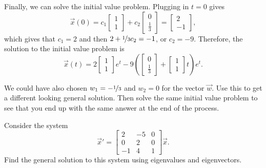 \documentclass{ximera}
\begin{document}
\begin{exampleSol}
    Finally, we can solve the initial value problem. Plugging in $t=0$ gives
    \begin{equation*}
        \vec{x}(0) = c_1 
        \begin{bmatrix} 
            1 \\ 
            1 
        \end{bmatrix} + c_2 
        \begin{bmatrix} 
            0 \\ 
            \frac{1}{3} 
        \end{bmatrix} = 
        \begin{bmatrix} 
            2 \\ 
            -1 
        \end{bmatrix},
    \end{equation*}
    which gives that $c_1 = 2$ and then $2 + \nicefrac{1}{3}c_2 = -1$, or $c_2 = -9$. Therefore, the solution to the initial value problem is
    \begin{equation*}
        \vec{x}(t) = 2 
        \begin{bmatrix} 
            1 \\ 
            1 
        \end{bmatrix} 
        e^t - 9 \left(
        \begin{bmatrix} 
            0 \\ 
            \frac{1}{3}
        \end{bmatrix} + 
        \begin{bmatrix} 
            1 \\ 
            1 
        \end{bmatrix} 
        t \right) e^{t}.
    \end{equation*}
\end{exampleSol}

\begin{exercise}
    We could have also chosen $w_1 = -\nicefrac{1}{3}$ and $w_2 = 0$ for the vector $\vec{w}$. Use this to get a different looking general solution. Then solve the same initial value problem to see that you end up with the same answer at the end of the process. 
\end{exercise}

\begin{example}
    Consider the system
    \begin{equation*}
        \vec{x}' =
        \begin{bmatrix}
            2 & -5 & 0 \\
            0 & 2 & 0 \\
            -1 & 4 & 1
        \end{bmatrix}
        \vec{x} .
    \end{equation*}
    Find the general solution to this system using eigenvalues and eigenvectors.
\end{example}
\end{document}
